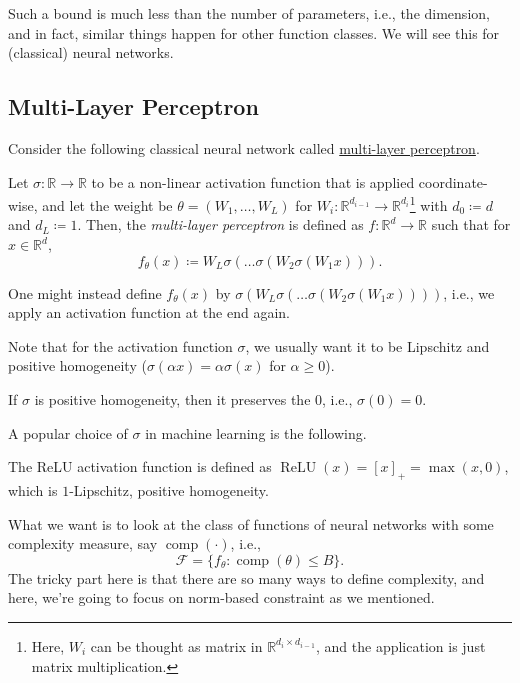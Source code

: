 Such a bound is much less than the number of parameters, i.e., the dimension, and in fact, similar things happen for other function classes. We will see this for (classical) neural networks.

\subsection{Multi-Layer Perceptron}
Consider the following classical neural network called \hyperref[def:MLP]{multi-layer perceptron}.

\begin{definition}\label{def:MLP}
	Let \(\sigma \colon \mathbb{R} \to \mathbb{R} \) to be a non-linear activation function that is applied coordinate-wise, and let the weight be \(\theta = (W_1, \dots , W_L)\) for \(W_i \colon \mathbb{R} ^{d_{i-1} } \to \mathbb{R} ^{d_i}\)\footnote{Here, \(W_i\) can be thought as matrix in \(\mathbb{R} ^{d_i \times d_{i-1}}\), and the application is just matrix multiplication.} with \(d_0 \coloneqq d\) and \(d_L \coloneqq 1\). Then, the \emph{multi-layer perceptron} is defined as \(f\colon \mathbb{R} ^d \to \mathbb{R} \) such that for \(x\in \mathbb{R} ^d\),
	\[
		f_\theta (x) \coloneqq W_L \sigma (\dots \sigma (W_2 \sigma (W_1 x))).
	\]
\end{definition}

\begin{note}
	One might instead define \(f_\theta (x)\) by \(\sigma (W_L \sigma ( \dots \sigma (W_2 \sigma (W_1 x))))\), i.e., we apply an activation function at the end again.
\end{note}

Note that for the activation function \(\sigma \), we usually want it to be Lipschitz and positive homogeneity (\(\sigma (\alpha x) = \alpha \sigma (x)\) for \(\alpha \geq 0\)).

\begin{note}
	If \(\sigma \) is positive homogeneity, then it preserves the \(0\), i.e., \(\sigma (0) = 0\).
\end{note}

A popular choice of \(\sigma \) in machine learning is the following.

\begin{eg}[ReLU]
	The ReLU activation function is defined as \(\operatorname{ReLU}(x) = [x]_+ = \max (x, 0)\), which is \(1\)-Lipschitz, positive homogeneity.
\end{eg}

What we want is to look at the class of functions of neural networks with some complexity measure, say \(\operatorname{comp}(\cdot) \), i.e.,
\[
	\mathscr{F} = \{ f_\theta \colon \operatorname{comp}(\theta ) \leq B \}.
\]
The tricky part here is that there are so many ways to define complexity, and here, we're going to focus on norm-based constraint as we mentioned.

